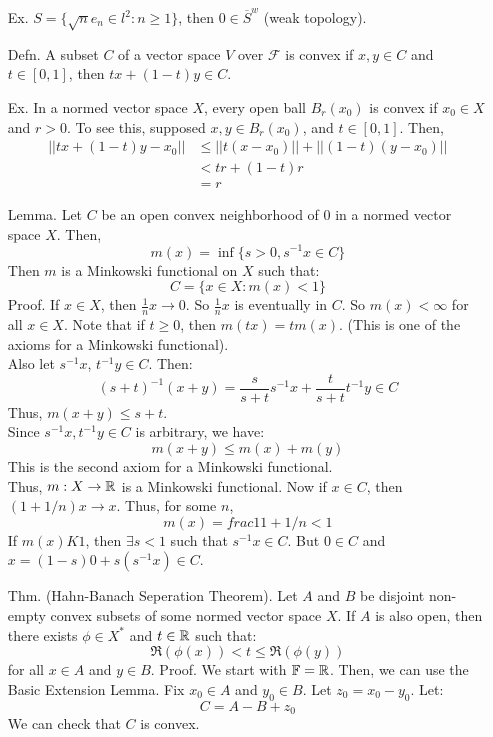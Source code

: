\documentclass[12pt]{article}
\begin{document}
\begin{itemize}
    \item[Ex.] $S = \{ \sqrt{n}e_n \in l^2 : n \geq 1\}$, then $0 \in \overline{S}^w$ (weak topology).
    \item[Defn.] A subset $C$ of a vector space $V$ over $\mathcal{F}$ is convex if $x, y \in C$ and $t \in [0, 1]$, then $tx + (1-t)y \in C$.
    \item[Ex.] In a normed vector space $X$, every open ball $B_r(x_0)$ is convex if $x_0 \in X$ and $r > 0$. To see this, supposed $x, y \in B_r(x_0)$, and $t \in [0, 1]$. Then,
    \begin{align*}
        ||tx+(1-t)y - x_0|| &\leq ||t(x-x_0)|| + ||(1-t)(y-x_0)|| \\
        &< tr + (1-t)r \\
        &= r
    \end{align*}
    \item[Lemma.] Let $C$ be an open convex neighborhood of $0$ in a normed vector space $X$. Then, 
    \[m(x) = \inf\{s > 0, s^{-1}x \in C\}\]
    Then $m$ is a Minkowski functional on $X$ such that: 
    \[C = \{x \in X: m(x) < 1\}\]
    Proof. If $x \in X$, then $\frac1n x \to 0$. So $\frac1n x$ is eventually in $C$. So $m(x) < \infty$ for all $x \in X$. \bbni
    Note that if $t \geq 0$, then $m(tx) = tm(x)$. (This is one of the axioms for a Minkowski functional). \\
    Also let $s^{-1}x$, $t^{-1}y \in C$. Then: 
    \[ (s+t)^{-1}(x+y) = \frac{s}{s+t}s^{-1}x + \frac{t}{s+t}t^{-1}y \in C\]
    Thus, $m(x+y) \leq s + t$. \\
    Since $s^{-1}x, t^{-1}y \in C$ is arbitrary, we have:
    \[ m(x+y) \leq m(x) + m(y)\]
    This is the second axiom for a Minkowski functional. \\
    Thus, $m: X \to \mathbb R$ is a Minkowski functional. Now if $x \in C$, then $(1+1/n)x \to x$. Thus, for some $n$, 
    \[ m(x) = frac{1}{1+1/n} < 1\]
    If $m(x) K 1$, then $\exists s < 1$ such that $s^{-1}x \in C$. \bbni
    But $0 \in C$ and $x = (1-s)0 + s(s^{-1}x) \in C$. 
    \item[Thm.] (Hahn-Banach Seperation Theorem). Let $A$ and $B$ be disjoint non-empty convex subsets of some normed vector space $X$. If $A$ is also open, then there exists $\phi \in X^*$ and $t \in \mathbb R$ such that: 
    \[ \Re(\phi(x)) < t \leq \Re(\phi(y)) \]
    for all $x \in A$ and $y \in B$. \bbni
    Proof. We start with $\mathbb{F} = \mathbb R$. Then, we can use the Basic Extension Lemma. Fix $x_0 \in A$ and $y_0 \in B$. Let $z_0 = x_0 - y_0$. Let: 
    \[ C = A-B + z_0\]
    We can check that $C$ is convex. \\

\end{itemize}
\end{document}
